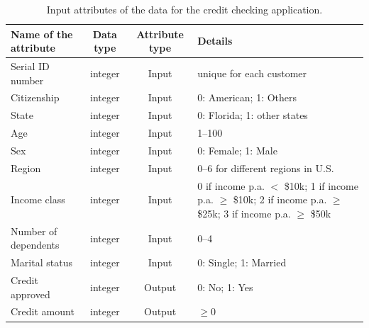 \documentclass[runningheads]{llncs}
\begin{document}
\begin{table}[!htb]
\centering
\caption{Input attributes of the data for the credit checking application.}
\label{table:credit}
\begin{tabularx}{\textwidth}{|l|c|c|X|}
\hline
\textbf{Name of the attribute} & \textbf{Data type} & \textbf{Attribute type} & \textbf{Details} \\
\hline
Serial ID number & integer & Input & unique for each customer \\
\hline
Citizenship & integer & Input & 0: American; 1: Others \\
\hline
State & integer & Input & 0: Florida; 1: other states \\
\hline
Age & integer & Input & 1--100 \\
\hline
Sex & integer & Input & 0: Female; 1: Male \\
\hline
Region & integer & Input & 0--6 for different regions in U.S. \\
\hline
Income class & integer & Input & 0 if income p.a. $<$ \$10k; 1 if income p.a. $\geq$ \$10k; 2 if income p.a. $\geq$ \$25k; 3 if income p.a. $\geq$ \$50k \\
\hline
Number of dependents & integer & Input & 0--4 \\
\hline
Marital status & integer & Input & 0: Single; 1: Married \\
\hline
Credit approved & integer & Output & 0: No; 1: Yes \\
\hline
Credit amount & integer & Output & $\geq 0$ \\
\hline
\end{tabularx}
\end{table}
\end{document}
